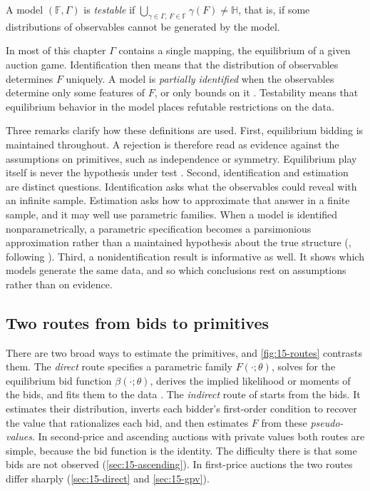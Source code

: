 \begin{definition}\label{def:15-testable}
A model $(\mathbb F,\Gamma)$ is \emph{testable} if $\bigcup_{\gamma\in\Gamma,\,F\in\mathbb F}\gamma(F)\neq\mathbb H$,
that is, if some distributions of observables cannot be generated by the model.
\end{definition}

In most of this chapter $\Gamma$ contains a single mapping, the equilibrium of a given auction game. Identification
then means that the distribution of observables determines $F$ uniquely. A model is \emph{partially identified}
when the observables determine only some features of $F$, or only bounds on it \citep[Section~1]{AtheyHaile2007}.
Testability means that equilibrium behavior in the model places refutable restrictions on the data.

Three remarks clarify how these definitions are used. First, equilibrium bidding is maintained throughout. A
rejection is therefore read as evidence against the assumptions on primitives, such as independence or symmetry.
Equilibrium play itself is never the hypothesis under test \citep[p.~2114]{AtheyHaile2002}. Second, identification and estimation are
distinct questions. Identification asks what the observables could reveal with an infinite sample. Estimation
asks how to approximate that answer in a finite sample, and it may well use parametric families. When a model is
identified nonparametrically, a parametric specification becomes a parsimonious approximation rather than a
maintained hypothesis about the true structure (\citealp[p.~2109]{AtheyHaile2002}, following \citealp{Roehrig1988}).
Third, a
nonidentification result is informative as well. It shows which models generate the same data, and so which
conclusions rest on assumptions rather than on evidence.

\subsection{Two routes from bids to primitives}\label{sec:15-routes}

There are two broad ways to estimate the primitives, and \cref{fig:15-routes} contrasts them. The \emph{direct}
route specifies a parametric family $F(\cdot;\theta)$, solves for the equilibrium bid function $\beta(\cdot;\theta)$,
derives the implied likelihood or moments of the bids, and fits them to the data
\citep{Paarsch1992,DonaldPaarsch1996,LaffontOssardVuong1995}. The \emph{indirect} route of
\citet{GuerrePerrigneVuong2000} starts from the bids. It estimates their distribution, inverts each bidder's
first-order condition to recover the value that rationalizes each bid, and then estimates $F$ from these
\emph{pseudo-values}. In second-price and ascending auctions with private values both routes are simple, because
the bid function is the identity. The difficulty there is that some bids are not observed (\cref{sec:15-ascending}).
In first-price auctions the two routes differ sharply (\cref{sec:15-direct} and \cref{sec:15-gpv}).

